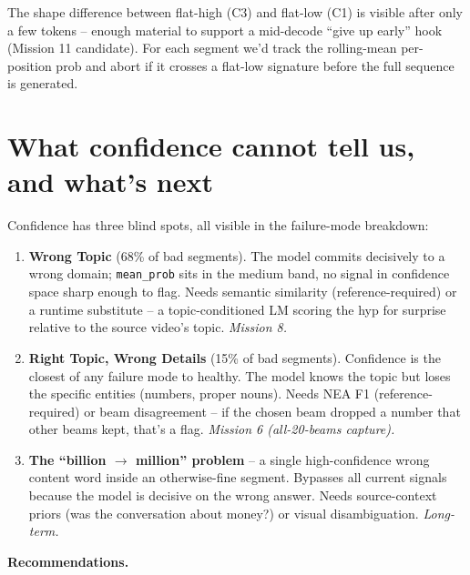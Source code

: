 \documentclass[11pt, a4paper]{article}
\begin{document}
The shape difference between flat-high (C3) and flat-low (C1) is visible after only a few tokens -- enough material to support a mid-decode ``give up early'' hook (Mission 11 candidate). For each segment we'd track the rolling-mean per-position prob and abort if it crosses a flat-low signature before the full sequence is generated.

\section{What confidence cannot tell us, and what's next}

Confidence has three blind spots, all visible in the failure-mode breakdown:

\begin{enumerate}[leftmargin=*]
  \item \textbf{Wrong Topic} (68\% of bad segments). The model commits decisively to a wrong domain; \texttt{mean\_prob} sits in the medium band, no signal in confidence space sharp enough to flag. Needs semantic similarity (reference-required) or a runtime substitute -- a topic-conditioned LM scoring the hyp for surprise relative to the source video's topic. \emph{Mission 8.}
  \item \textbf{Right Topic, Wrong Details} (15\% of bad segments). Confidence is the closest of any failure mode to healthy. The model knows the topic but loses the specific entities (numbers, proper nouns). Needs NEA F1 (reference-required) or beam disagreement -- if the chosen beam dropped a number that other beams kept, that's a flag. \emph{Mission 6 (all-20-beams capture).}
  \item \textbf{The ``billion $\to$ million'' problem} -- a single high-confidence wrong content word inside an otherwise-fine segment. Bypasses all current signals because the model is decisive on the wrong answer. Needs source-context priors (was the conversation about money?) or visual disambiguation. \emph{Long-term.}
\end{enumerate}

\textbf{Recommendations.}
\end{document}

